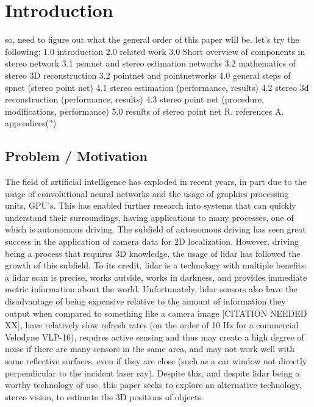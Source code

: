 \section{Introduction}
so, need to figure out what the general order of this paper will be. let's try the following: 
1.0 introduction
2.0 related work
3.0 Short overview of components in stereo network
  3.1 psmnet and stereo estimation networks
  3.2 mathematics of stereo 3D reconstruction
  3.2 pointnet and pointnetworks
4.0 general steps of spnet (stereo point net)
  4.1 stereo estimation (performance, results)
  4.2 stereo 3d reconstruction (performance, results)
  4.3 stereo point net (procedure, modifications, performance)
5.0 results of stereo point net
R. references
A. appendices(?)

\subsection{Problem / Motivation}
The field of artificial intelligence has exploded in recent years, in part due to the usage of convolutional neural networks and the usage of graphics processing units, GPU's. This has enabled further research into systems that can quickly understand their surroundings, having applications to many processes, one of which is autonomous driving. The subfield of autonomous driving has seen great success in the application of camera data for 2D localization. However, driving being a process that requires 3D knowledge, the usage of lidar has followed the growth of this subfield. To its credit, lidar is a technology with multiple benefits: a lidar scan is precise, works outside, works in darkness, and provides immediate metric information about the world. Unfortunately, lidar sensors also have the disadvantage of being expensive relative to the amount of information they output when compared to something like a camera image [CITATION NEEDED XX], have relatively slow refresh rates (on the order of 10 Hz for a commercial Velodyne VLP-16), requires active sensing and thus may create a high degree of noise if there are many sensors in the same area, and may not work well with some reflective surfaces, even if they are close (such as a car window not directly perpendicular to the incident laser ray). Despite this, and despite lidar being a worthy technology of use, this paper seeks to explore an alternative technology, stereo vision, to estimate the 3D positions of objects. 

